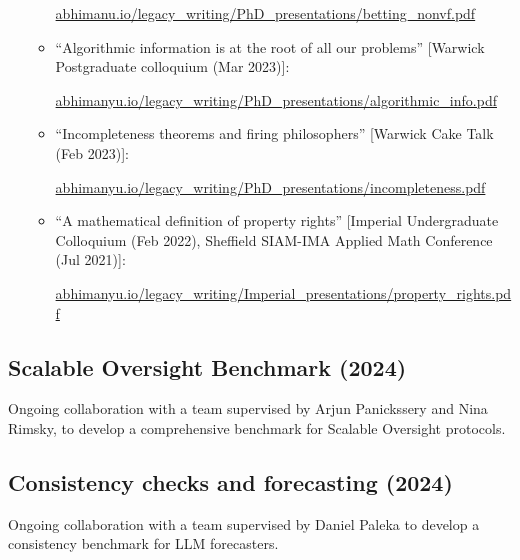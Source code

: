 \documentclass{article}
\newenvironment{relatedwork}
   {
     \begin{mdframed}[
       leftmargin=1cm,
       rightmargin=0cm,
       innerleftmargin=10pt,
       innerrightmargin=0pt,
       innertopmargin=0.5em,
       innerbottommargin=0.5em,
       linewidth=1pt,
       linecolor=gray,
       topline=false,
       bottomline=false,
       rightline=false
     ]
     \footnotesize
   }
   {
     \end{mdframed}
   }
\begin{document}
\begin{relatedwork}
\begin{itemize}[label=—]
\begin{itemize}
                        \href{https://abhimanyu.io/legacy_writing/PhD_presentations/betting_nonvf.pdf}{abhimanu.io/legacy\_writing/PhD\_presentations/betting\_nonvf.pdf}

                  \item ``Algorithmic information is at the root of all our problems'' [Warwick Postgraduate colloquium (Mar 2023)]:

                        \href{https://abhimanyu.io/legacy_writing/PhD_presentations/algorithmic_info.pdf}{abhimanyu.io/legacy\_writing/PhD\_presentations/algorithmic\_info.pdf}

                  \item ``Incompleteness theorems and firing philosophers'' [Warwick Cake Talk (Feb 2023)]:

                        \href{https://abhimanyu.io/legacy_writing/PhD_presentations/incompleteness.pdf}{abhimanyu.io/legacy\_writing/PhD\_presentations/incompleteness.pdf}

                  \item ``A mathematical definition of property rights'' [Imperial Undergraduate Colloquium (Feb 2022), Sheffield SIAM-IMA Applied Math Conference (Jul 2021)]:

                        \href{https://abhimanyu.io/legacy_writing/Imperial_presentations/property_rights.pdf}{abhimanyu.io/legacy\_writing/Imperial\_presentations/property\_rights.pdf}
              \end{itemize}
    \end{itemize}
\end{relatedwork}

\subsection*{Scalable Oversight Benchmark (2024)}

Ongoing collaboration with a team supervised by Arjun Panickssery and Nina Rimsky, to develop a comprehensive benchmark for Scalable Oversight protocols.

\subsection*{Consistency checks and forecasting (2024)}

Ongoing collaboration with a team supervised by Daniel Paleka to develop a consistency benchmark for LLM forecasters.
\end{document}
